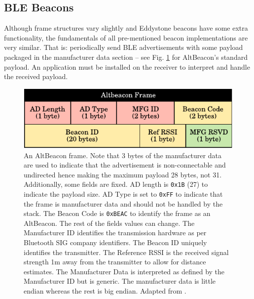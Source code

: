 \documentclass[conference]{IEEEtran} %
\begin{document}
\subsection{BLE Beacons}
Although frame structures vary slightly and Eddystone beacons have some extra functionality, the fundamentals of all pre-mentioned beacon implementations are very similar. That is: periodically send BLE advertisements with some payload packaged in the manufacturer data section -- see Fig. \ref{fig:altbeacon_frame} for AltBeacon's standard payload. An application must be installed on the receiver to interpret and handle the received payload.

\begin{figure}[H]
    \centering
   	\includegraphics[scale=0.75]{Figures/altbeacon_frame}
    \caption[Altbeacon frame]{
  An AltBeacon frame. Note that 3 bytes of the manufacturer data are used to indicate that the advertisement is non-connectable and undirected hence making the maximum payload 28 bytes, not 31. Additionally, some fields are fixed. AD length is \texttt{0x1B} (27) to indicate the payload size. AD Type is set to \texttt{0xFF} to indicate that the frame is manufacturer data and should not be handled by the stack. The Beacon Code is \texttt{0xBEAC} to identify the frame as an AltBeacon. The rest of the fields values can change. The Manufacturer ID identifies the transmission hardware as per Bluetooth SIG company identifiers. The Beacon ID uniquely identifies the transmitter. The Reference RSSI is the received signal strength 1m away from the transmitter to allow for distance estimates. The Manufacturer Data is interpreted as defined by the Manufacturer ID but is generic. The manufacturer data is little endian whereas the rest is big endian. Adapted from \cite{BT:ALTBEACON}.
    }
    \label{fig:altbeacon_frame}
\end{figure}
\end{document}
